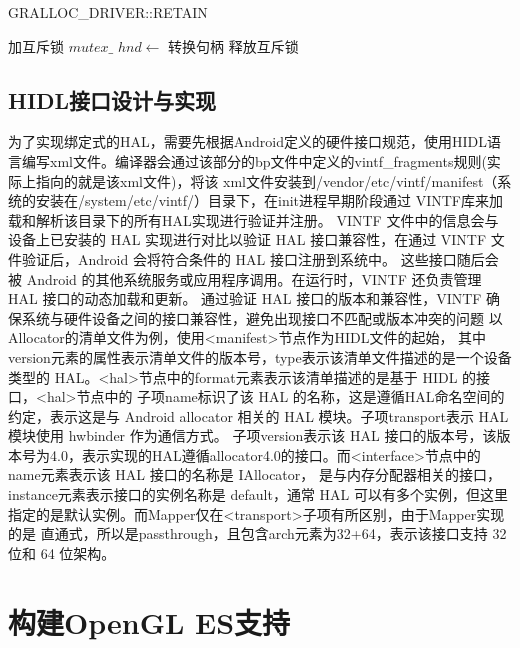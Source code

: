 \begin{algorithm}
\caption{GRALLOC\_DRIVER::RETAIN}
\label{algo:RETAIN}
\SetAlgoLined
{}
\BlankLine
加互斥锁 $mutex\_$\;
$hnd \leftarrow$ 转换句柄\;
释放互斥锁\;
\end{algorithm}

\subsection{HIDL接口设计与实现}
为了实现绑定式的HAL，需要先根据Android定义的硬件接口规范，使用HIDL语言编写xml文件。编译器会通过该部分的bp文件中定义的vintf\_fragments规则(实际上指向的就是该xml文件)，将该
xml文件安装到/vendor/etc/vintf/manifest（系统的安装在/system/etc/vintf/）目录下，在init进程早期阶段通过 VINTF库来加载和解析该目录下的所有HAL实现进行验证并注册。
VINTF 文件中的信息会与设备上已安装的 HAL 实现进行对比以验证 HAL 接口兼容性，在通过 VINTF 文件验证后，Android 会将符合条件的 HAL 接口注册到系统中。
这些接口随后会被 Android 的其他系统服务或应用程序调用。在运行时，VINTF 还负责管理 HAL 接口的动态加载和更新。
通过验证 HAL 接口的版本和兼容性，VINTF 确保系统与硬件设备之间的接口兼容性，避免出现接口不匹配或版本冲突的问题
以Allocator的清单文件为例，使用<manifest>节点作为HIDL文件的起始，
其中version元素的属性表示清单文件的版本号，type表示该清单文件描述的是一个设备类型的 HAL。<hal>节点中的format元素表示该清单描述的是基于 HIDL 的接口，<hal>节点中的
子项name标识了该 HAL 的名称，这是遵循HAL命名空间的约定，表示这是与 Android allocator 相关的 HAL 模块。子项transport表示 HAL 模块使用 hwbinder 作为通信方式。
子项version表示该 HAL 接口的版本号，该版本号为4.0，表示实现的HAL遵循allocator4.0的接口。而<interface>节点中的name元素表示该 HAL 接口的名称是 IAllocator，
是与内存分配器相关的接口，instance元素表示接口的实例名称是 default，通常 HAL 可以有多个实例，但这里指定的是默认实例。而Mapper仅在<transport>子项有所区别，由于Mapper实现的是
直通式，所以是passthrough，且包含arch元素为32+64，表示该接口支持 32 位和 64 位架构。

\section{构建OpenGL ES支持}

